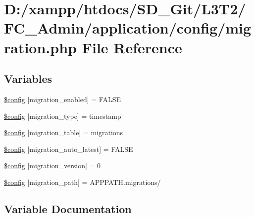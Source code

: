 \hypertarget{application_2config_2migration_8php}{}\section{D\+:/xampp/htdocs/\+S\+D\+\_\+\+Git/\+L3\+T2/\+F\+C\+\_\+\+Admin/application/config/migration.php File Reference}
\label{application_2config_2migration_8php}
\subsection*{Variables}
\begin{DoxyCompactItemize}
\item 
\hyperlink{application_2config_2migration_8php_ad6392796c28d7391c3977c2cceef3cc2}{\$config} \mbox{[}\textquotesingle{}migration\+\_\+enabled\textquotesingle{}\mbox{]} = F\+A\+L\+S\+E
\item 
\hyperlink{application_2config_2migration_8php_ad5a6eb0992227e3fabe3576b61467f11}{\$config} \mbox{[}\textquotesingle{}migration\+\_\+type\textquotesingle{}\mbox{]} = \textquotesingle{}timestamp\textquotesingle{}
\item 
\hyperlink{application_2config_2migration_8php_ab6c0facc32c2cc46aa003a67bd841703}{\$config} \mbox{[}\textquotesingle{}migration\+\_\+table\textquotesingle{}\mbox{]} = \textquotesingle{}migrations\textquotesingle{}
\item 
\hyperlink{application_2config_2migration_8php_ad90ceba960297b62c14da775e8c0c7db}{\$config} \mbox{[}\textquotesingle{}migration\+\_\+auto\+\_\+latest\textquotesingle{}\mbox{]} = F\+A\+L\+S\+E
\item 
\hyperlink{application_2config_2migration_8php_a53ca48939aaf8c92f0c0d239a294fff2}{\$config} \mbox{[}\textquotesingle{}migration\+\_\+version\textquotesingle{}\mbox{]} = 0
\item 
\hyperlink{application_2config_2migration_8php_abc04383313304e348060a7ee39f5a8ee}{\$config} \mbox{[}\textquotesingle{}migration\+\_\+path\textquotesingle{}\mbox{]} = A\+P\+P\+P\+A\+T\+H.\textquotesingle{}migrations/\textquotesingle{}
\end{DoxyCompactItemize}


\subsection{Variable Documentation}
\hypertarget{application_2config_2migration_8php_ad6392796c28d7391c3977c2cceef3cc2}{}
